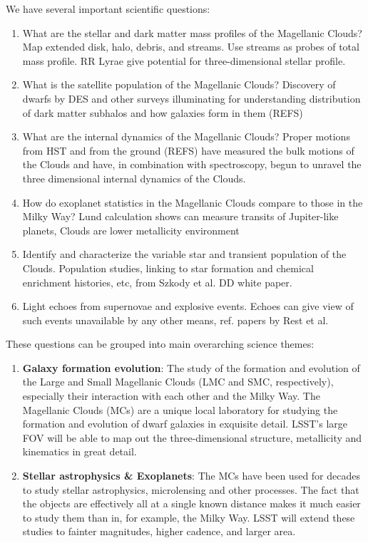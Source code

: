 We have several important scientific questions:
\begin{enumerate}

\item What are the stellar and dark matter mass profiles of the
Magellanic Clouds?  Map extended disk, halo, debris, and streams.  Use
streams as probes of total mass profile.  RR Lyrae give potential for
three-dimensional stellar profile.

\item What is the satellite population of the Magellanic Clouds?
Discovery of dwarfs by DES and other surveys illuminating for
understanding distribution of dark matter subhalos and how galaxies
form in them (REFS)

\item What are the internal dynamics of the Magellanic Clouds?  Proper
motions from HST and from the ground (REFS) have measured the bulk
motions of the Clouds and have, in combination with spectroscopy,
begun to unravel the three dimensional internal dynamics of the
Clouds.

\item How do exoplanet statistics in the Magellanic Clouds compare to
those in the Milky Way?  Lund calculation shows can measure transits
of Jupiter-like planets, Clouds are lower metallicity environment

\item Identify and characterize the variable star and transient
population of the Clouds.  Population studies, linking to star
formation and chemical enrichment histories, etc, from Szkody et al.
DD white paper.

\item Light echoes from supernovae and explosive events.  Echoes can
give view of such events unavailable by any other means, ref. papers
by Rest et al.
\end{enumerate}


These questions can be grouped into main overarching science themes:
\begin{enumerate}
\item {\bf Galaxy formation evolution}: The study of the formation and
evolution of the Large and Small Magellanic Clouds (LMC and SMC,
respectively), especially their interaction with each other and the
Milky Way. The Magellanic Clouds (MCs) are a unique local laboratory
for studying the formation and evolution of dwarf galaxies in
exquisite detail.  LSST's large FOV will be able to map out the
three-dimensional structure, metallicity and kinematics in great
detail.
\item {\bf Stellar astrophysics \& Exoplanets}:  The MCs have been
used for decades to study stellar astrophysics, microlensing and other
processes.  The fact that the objects are effectively all at a single
known distance makes it much easier to study them than in, for
example, the Milky Way.  LSST will extend these studies to fainter
magnitudes, higher cadence, and larger area.
\end{enumerate}

